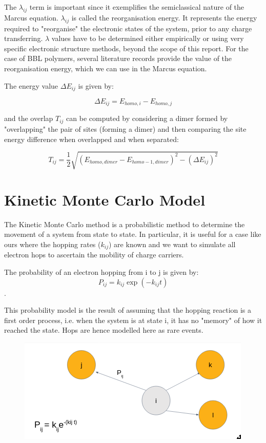 \documentclass{article}
\begin{document}
The $\lambda_{ij}$ term is important since it exemplifies the semiclassical nature of the Marcus equation. $\lambda_{ij}$ is called the reorganisation energy. It represents the energy required to "reorganise" the electronic states of the system, prior to any charge transferring. $\lambda$ values have to be determined either empirically or using very specific electronic structure methods, beyond the scope of this report. %
For the case of BBL polymers, several literature records provide the value of the reorganisation energy, which we can use in the Marcus equation.

The energy value $\Delta E_{ij}$ is given by:

$$\Delta E_{ij} = E_{homo, i} - E_{homo, j}$$

and the overlap $T_{ij}$ can be computed by considering a dimer formed by "overlapping" the pair of sites (forming a dimer) and then comparing the site energy difference when overlapped and when separated:

$$T_{ij} = \frac{1}{2} \sqrt{(E_{homo,dimer} - E_{homo-1,dimer})^2 - (\Delta E_{ij})^2}$$

\section{Kinetic Monte Carlo Model}


The Kinetic Monte Carlo method is a probabilistic method to determine the movement of a system from state to state. In particular, it is useful for a case like ours where the hopping rates ($k_{ij}$) are known and we want to simulate all electron hops to ascertain the mobility of charge carriers.

The probability of an electron hopping from i to j is given by: $$P_{ij} = k_{ij} \exp(-k_{ij} t)$$. 

This probability model is the result of assuming that the hopping reaction is a first order process, i.e. when the system is at state i, it has no "memory" of how it reached the state. Hops are hence modelled here as rare events.

\begin{figure}

    \centering
    \includegraphics[scale=0.6]{fig4}
\end{figure}
\end{document}
